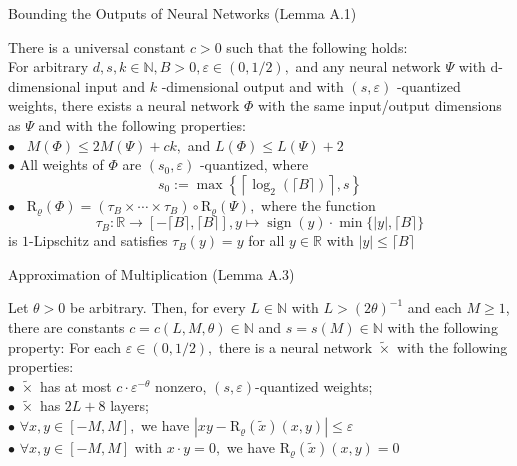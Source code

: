 \documentclass{if-beamer}
\begin{document}
\begin{frame}{Bounding the Outputs of Neural Networks (Lemma A.1)}
    \begin{tcolorbox}
        There is a universal constant $c>0$ such that the following holds:\\
        For arbitrary $d, s, k \in \mathbb{N}, B>0, \varepsilon \in(0,1 / 2),$ and any neural network $\Psi$ with d-dimensional input and
        $k$ -dimensional output and with $(s, \varepsilon)$ -quantized weights, there exists a neural network $\Phi$ with the same input/output dimensions as $\Psi$ and with the following properties:\\
        {\small
        $\bullet$ \, $M(\Phi) \leq 2 M(\Psi)+c k,$ and $L(\Phi) \leq L(\Psi)+2$\\
        $\bullet$ All weights of $\Phi$ are $\left(s_{0}, \varepsilon\right)$ -quantized, where
        $$s_{0}:=\max \left\{\left\lceil\log _{2}(\lceil B\rceil)\right\rceil, s\right\}$$
        $\bullet$ \, $\mathrm{R}_{\varrho}(\Phi)=\left(\tau_{B} \times \cdots \times \tau_{B}\right) \circ \mathrm{R}_{\varrho}(\Psi),$ where the function
        \[
        \tau_{B}: \mathbb{R} \rightarrow[-\lceil B\rceil,\lceil B\rceil], y \mapsto \operatorname{sign}(y) \cdot \min \{|y|,\lceil B\rceil\}
        \]
        is $1$-Lipschitz and satisfies $\tau_{B}(y)=y$ for all $y \in \mathbb{R}$ with $|y| \leq\lceil B\rceil$
        }%
    \end{tcolorbox}
\end{frame}

\begin{frame}{Approximation of Multiplication (Lemma A.3)}
    \begin{tcolorbox}
        Let $\theta>0$ be arbitrary. Then, for every $L \in \mathbb{N}$ with $L>(2 \theta)^{-1}$ and each $M \geq 1$, there are constants $c=c(L, M, \theta) \in \mathbb{N}$ and $s=s(M) \in \mathbb{N}$ with the following property: For each $\varepsilon \in(0,1 / 2),$ there is a neural network $\widetilde{\times}$ with the following properties:\\
        $\bullet$ $\widetilde{\times}$ has at most $c \cdot \varepsilon^{-\theta}$ nonzero, $(s, \varepsilon)$-quantized weights;\\
        $\bullet$ $\widetilde{\times}$ has $2L+8$ layers;\\
        $\bullet$ $\forall x, y \in[-M, M],$ we have $\left|xy-\mathrm{R}_{\varrho}(\widetilde{x})(x, y)\right| \leq \varepsilon$\\
        $\bullet$  $\forall x, y \in[-M, M]$ with $x \cdot y=0,$ we have $\mathrm{R}_{\varrho}(\widetilde{x})(x, y)=0$
    \end{tcolorbox}
\end{frame}
\end{document}
